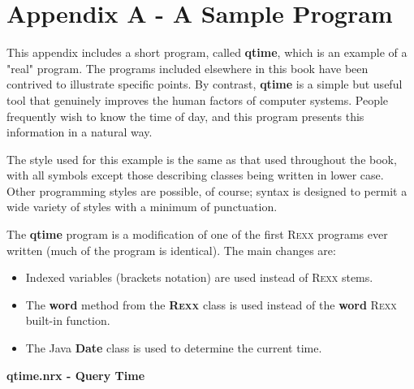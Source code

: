 \chapter{Appendix A - A Sample \nr{} Program}\label{refappa}
 
This appendix includes a short program, called \textbf{qtime}, which
is an example of a "real" \nr{} program.  The programs included
elsewhere in this book have been contrived to illustrate specific
points.  By contrast, \textbf{qtime} is a simple but useful tool that
genuinely improves the human factors of computer systems.  People
frequently wish to know the time of day, and this program presents this
information in a natural way.
 
The style used for this example is the same as that used throughout
the
book,
with all symbols except those describing classes being written
in lower case.  Other \nr{} programming styles are possible, of
course; \nr{} syntax is designed to permit a wide variety of styles
with a minimum of punctuation.
 
The \textbf{qtime} program is a modification of one of the first R\textsc{exx}
programs ever written (much of the program is identical).  The main
changes are:
\begin{itemize}
\item Indexed variables (brackets notation) are used instead of R\textsc{exx}
stems.
\item The \textbf{word} method from the \textbf{R\textsc{exx}} class is used
instead of the \textbf{word} R\textsc{exx} built-in function.
\item The Java \textbf{Date} class is used to determine the current
time.
\end{itemize}
 
\index{,}
\textbf{qtime.nrx - Query Time}

